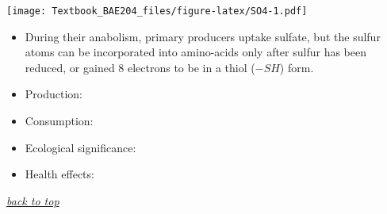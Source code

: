 \documentclass[]{book}
\theoremstyle{definition}
\theoremstyle{definition}
\theoremstyle{definition}
\theoremstyle{remark}
\begin{document}
\texttt{[image: Textbook\_BAE204\_files/figure-latex/SO4-1.pdf]}

\begin{itemize}
\item
  During their anabolism, primary producers uptake sulfate, but the
  sulfur atoms can be incorporated into amino-acids only after sulfur
  has been reduced, or gained 8 electrons to be in a thiol (\(-SH\))
  form.
\item
  Production:
\item
  Consumption:
\item
  Ecological significance:
\item
  Health effects:
\end{itemize}

\emph{\protect\hyperlink{top}{back to top}}


\end{document}
